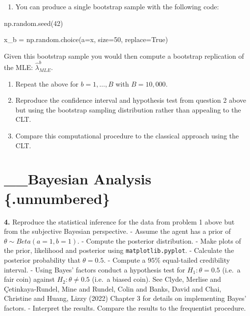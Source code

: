 \documentclass[
  letterpaper,
  DIV=11,
  numbers=noendperiod]{scrreprt}
\newenvironment{Shaded}{\begin{snugshade}}{\end{snugshade}}
\newcommand{\DecValTok}[1]{\textcolor[rgb]{0.68,0.00,0.00}{#1}}
\newcommand{\NormalTok}[1]{\textcolor[rgb]{0.00,0.23,0.31}{#1}}
\newcommand{\OperatorTok}[1]{\textcolor[rgb]{0.37,0.37,0.37}{#1}}
\newcommand{\VariableTok}[1]{\textcolor[rgb]{0.07,0.07,0.07}{#1}}
\providecommand{\tightlist}{%
  \setlength{\itemsep}{0pt}\setlength{\parskip}{0pt}}\usepackage{longtable,booktabs,array}
\begin{document}
\begin{enumerate}
\def\labelenumi{\alph{enumi}.}
\tightlist
\item
  You can produce a single bootstrap sample with the following code:
\end{enumerate}

\begin{Shaded}
\begin{Highlighting}[]
\NormalTok{np.random.seed(}\DecValTok{42}\NormalTok{)}

\NormalTok{x\_b }\OperatorTok{=}\NormalTok{ np.random.choice(a}\OperatorTok{=}\NormalTok{x, size}\OperatorTok{=}\DecValTok{50}\NormalTok{, replace}\OperatorTok{=}\VariableTok{True}\NormalTok{)}
\end{Highlighting}
\end{Shaded}

Given this bootstrap sample you would then compute a bootstrap
replication of the MLE: \(\hat{\lambda}^{b}_{MLE}\).

\begin{enumerate}
\def\labelenumi{\alph{enumi}.}
\setcounter{enumi}{1}
\item
  Repeat the above for \(b = 1, \ldots, B\) with \(B = 10,000\).
\item
  Reproduce the confidence interval and hypothesis test from question 2
  above but using the bootstrap sampling distribution rather than
  appealing to the CLT.
\item
  Compare this computational procedure to the classical approach using
  the CLT.
\end{enumerate}


\chapter*{\_\_Bayesian Analysis
\{.unnumbered\}}\label{bayesian-analysis-.unnumbered}


\textbf{4.} Reproduce the statistical inference for the data from
problem 1 above but from the subjective Bayesian perspective. - Assume
the agent has a prior of \(\theta \sim Beta(a=1, b=1)\). - Compute the
posterior distribution. - Make plots of the prior, likelihood and
posterior using \texttt{matplotlib.pyplot}. - Calculate the posterior
probability that \(\theta = 0.5\). - Compute a \(95\%\) equal-tailed
credibility interval. - Using Bayes' factors conduct a hypothesis test
for \(H_{1}: \theta = 0.5\) (i.e.~a fair coin) against
\(H_{2}: \theta \ne 0.5\) (i.e.~a biased coin). See Clyde, Merlise and
Çetinkaya-Rundel, Mine and Rundel, Colin and Banks, David and Chai,
Christine and Huang, Lizzy (2022) Chapter 3 for details on implementing
Bayes' factors. - Interpret the results. Compare the results to the
frequentist procedure.
\end{document}

